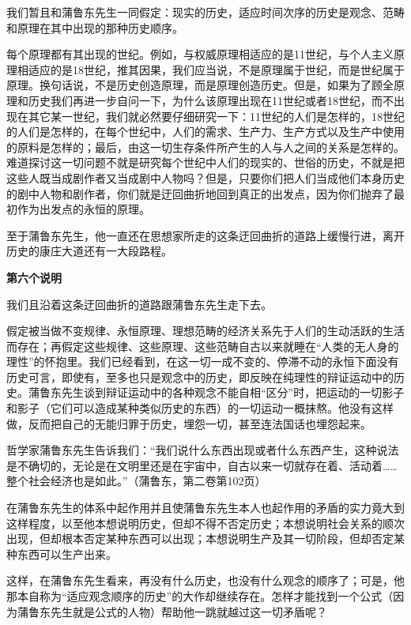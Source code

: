 \documentclass[a4paper,twoside,12pt]{ctexart}
\begin{document}
我们暂且和蒲鲁东先生一同假定：现实的历史，适应时间次序的历史是观念、范畴和原理在其中出现的那种历史顺序。

每个原理都有其出现的世纪。例如，与权威原理相适应的是11世纪，与个人主义原理相适应的是18世纪，推其因果，我们应当说，不是原理属于世纪，而是世纪属于原理。换句话说，不是历史创造原理，而是原理创造历史。但是，如果为了顾全原理和历史我们再进一步自问一下，为什么该原理出现在11世纪或者18世纪，而不出现在其它某一世纪，我们就必然要仔细研究一下：11世纪的人们是怎样的，18世纪的人们是怎样的，在每个世纪中，人们的需求、生产力、生产方式以及生产中使用的原料是怎样的；最后，由这一切生存条件所产生的人与人之间的关系是怎样的。难道探讨这一切问题不就是研究每个世纪中人们的现实的、世俗的历史，不就是把这些人既当成剧作者又当成剧中人物吗？但是，只要你们把人们当成他们本身历史的剧中人物和剧作者，你们就是迂回曲折地回到真正的出发点，因为你们抛弃了最初作为出发点的永恒的原理。

至于蒲鲁东先生，他一直还在思想家所走的这条迂回曲折的道路上缓慢行进，离开历史的康庄大道还有一大段路程。

\begin{center}
    \textbf{第六个说明}
\end{center}

我们且沿着这条迂回曲折的道路跟蒲鲁东先生走下去。

假定被当做不变规律、永恒原理、理想范畴的经济关系先于人们的生动活跃的生活而存在；再假定这些规律、这些原理、这些范畴自古以来就睡在“人类的无人身的理性”的怀抱里。我们已经看到，在这一切一成不变的、停滞不动的永恒下面没有历史可言，即使有，至多也只是观念中的历史，即反映在纯理性的辩证运动中的历史。蒲鲁东先生谈到辩证运动中的各种观念不能自相“区分”时，把运动的一切影子和影子（它们可以造成某种类似历史的东西）的一切运动一概抹熬。他没有这样做，反而把自己的无能归罪于历史，埋怨一切，甚至连法国话也埋怨起来。

哲学家蒲鲁东先生告诉我们：“我们说什么东西出现或者什么东西产生，这种说法是不确切的，无论是在文明里还是在宇宙中，自古以来一切就存在着、活动着……整个社会经济也是如此。”（蒲鲁东，第二卷第102页）

在蒲鲁东先生的体系中起作用并且使蒲鲁东先生本人也起作用的矛盾的实力竟大到这样程度，以至他本想说明历史，但却不得不否定历史；本想说明社会关系的顺次出现，但却根本否定某种东西可以出现；本想说明生产及其一切阶段，但却否定某种东西可以生产出来。

这样，在蒲鲁东先生看来，再没有什么历史，也没有什么观念的顺序了；可是，他那本自称为“适应观念顺序的历史”的大作却继续存在。怎样才能找到一个公式（因为蒲鲁东先生就是公式的人物）帮助他一跳就越过这一切矛盾呢？
\end{document}
